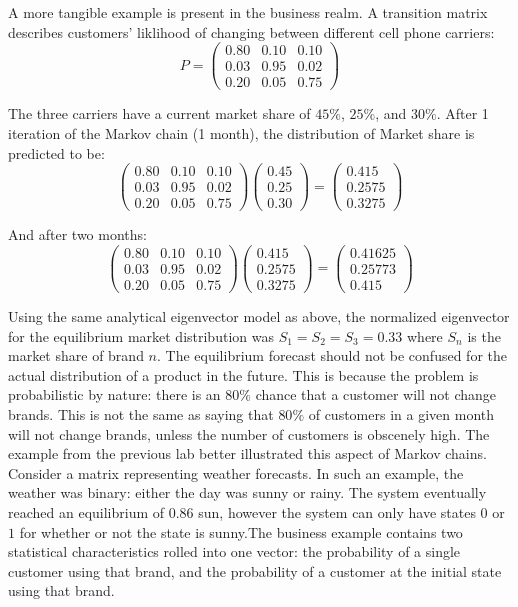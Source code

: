 \documentclass[twocolumn]{article}
\begin{document}
A more tangible example is present in the business realm. A transition matrix describes customers' liklihood of changing between different cell phone carriers:
\[
P = \begin{pmatrix}
0.80 & 0.10 & 0.10 \\
0.03 & 0.95 & 0.02 \\ 
0.20 & 0.05 & 0.75
\end{pmatrix}
\]

The three carriers have a current market share of $45\%$, $25\%$, and $30\%$. After 1 iteration of the Markov chain (1 month), the distribution of Market share is predicted to be:
\[
\begin{pmatrix}
0.80 & 0.10 & 0.10 \\
0.03 & 0.95 & 0.02 \\ 
0.20 & 0.05 & 0.75
\end{pmatrix} \begin{pmatrix} 0.45 \\ 0.25 \\ 0.30 \end{pmatrix} = \begin{pmatrix} 0.415 \\ 0.2575 \\ 0.3275 \end{pmatrix}
\]

And after two months:
\[
\begin{pmatrix}
0.80 & 0.10 & 0.10 \\
0.03 & 0.95 & 0.02 \\ 
0.20 & 0.05 & 0.75
\end{pmatrix} \begin{pmatrix} 0.415 \\ 0.2575 \\ 0.3275 \end{pmatrix} = \begin{pmatrix} 0.41625 \\ 0.25773 \\ 0.415 \end{pmatrix}
\]

Using the same analytical eigenvector model as above, the normalized eigenvector for the equilibrium market distribution was $S_1 = S_2 = S_3 = 0.33$ where $S_n$ is the market share of brand $n$. The equilibrium forecast should not be confused for the actual distribution of a product in the future. This is because the problem is probabilistic by nature: there is an $80\%$ chance that a customer will not change brands. This is not the same as saying that $80\%$ of customers in a given month will not change brands, unless the number of customers is obscenely high. The example from the previous lab better illustrated this aspect of Markov chains. Consider a matrix representing weather forecasts. In such an example, the weather was binary: either the day was sunny or rainy. The system eventually reached an equilibrium of $0.86$ sun, however the system can only have states $0$ or $1$ for whether or not the state is sunny.The business example contains two statistical characteristics rolled into one vector: the probability of a single customer using that brand, and the probability of a customer at the initial state using that brand.
\end{document}
